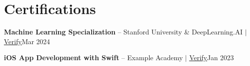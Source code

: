 \section{Certifications}
\resumeSubHeadingListStart

    \resumeProjectHeading
    {\textbf{Machine Learning Specialization} -- Stanford University \& DeepLearning.AI $|$ \href{https://example.com/verify/ml}{\underline{Verify}}}{Mar 2024}

    \resumeProjectHeading
    {\textbf{iOS App Development with Swift} -- Example Academy $|$ \href{https://example.com/verify/ios}{\underline{Verify}}}{Jan 2023}

\resumeSubHeadingListEnd
\vspace{2pt}
